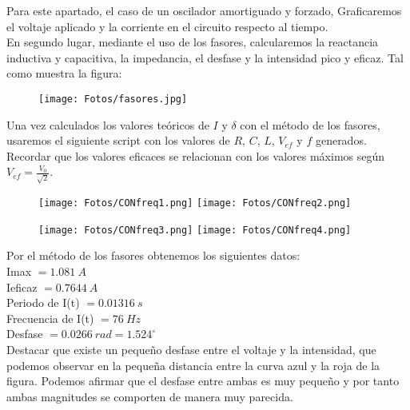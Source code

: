 \documentclass{article}
\begin{document}
    Para este apartado, el caso de un oscilador amortiguado y forzado, Graficaremos el voltaje aplicado y la corriente en el circuito respecto al tiempo. \\
    
    En segundo lugar, mediante el uso de los fasores, calcularemos la reactancia inductiva y capacitiva, la impedancia, el desfase y la intensidad pico y eficaz. Tal como muestra la figura:
    
    \begin{figure}[h]
        \centering
        \texttt{[image: Fotos/fasores.jpg]}
    \end{figure}
    
    Una vez calculados los valores teóricos de $I$ y $\delta$ con el método de los fasores, usaremos el siguiente script con los valores de $R$, $C$, $L$, $V_{ef}$ y $f$ generados. Recordar que los  valores eficaces se relacionan con los valores máximos según $V_{ef}=\frac{V_0}{\sqrt{2}}$.
    \begin{figure}[h]
        \centering
        \texttt{[image: Fotos/CONfreq1.png]}
        \texttt{[image: Fotos/CONfreq2.png]}
    \end{figure}
    \begin{figure}[h]
        \centering
        \texttt{[image: Fotos/CONfreq3.png]}
        \texttt{[image: Fotos/CONfreq4.png]}
    \end{figure}

\clearpage
    
    Por el método de los fasores obtenemos los siguientes datos:\\
    
    Imax $= 1.081\ A$\\
    Ieficaz $= 0.7644\ A$\\
    Periodo de I(t) $= 0.01316\ s$\\
    Frecuencia de I(t) $= 76\ Hz$\\
    Desfase $= 0.0266\ rad = 1.524^{\circ}$\\
    
    Destacar que existe un pequeño desfase entre el voltaje y la intensidad, que podemos observar en la pequeña distancia entre la curva azul y la roja de la figura. Podemos afirmar que el desfase entre ambas es muy pequeño y por tanto ambas magnitudes se comporten de manera muy parecida.\\
    
    \vspace{1.5cm}
\end{document}
